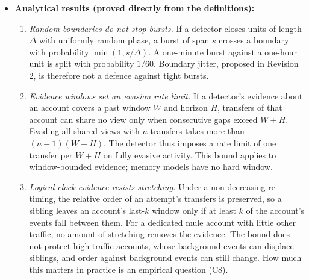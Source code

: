 \documentclass[11pt,a4paper]{article}
\begin{document}
\begin{itemize}[leftmargin=*]
\begin{enumerate}[leftmargin=*]
        \item \textbf{Timing-invariant detection (proposed).} A detector restricted to the logical-clock block of Step 4 and the event attributes, compared with the wall-clock detector on clean and attacked data. It needs no attack examples and no adversarial training. Its clean-data cost is the price of robustness, and it may be large, because wall-clock features carry real signal.
        \item \textbf{Gated: memory and two-stage aggregation.} Revision 2's DMT-GNN (GRU memory, per-counterparty Stage 1, cross-counterparty Stage 2) is built only if TD-GNN shows a modelling gap at small horizons relative to the feature baseline.
    \end{enumerate}
    \item \textbf{Analytical results (proved directly from the definitions):}
    \begin{enumerate}[leftmargin=*]
        \item \textit{Random boundaries do not stop bursts.} If a detector closes units of length $\Delta$ with uniformly random phase, a burst of span $s$ crosses a boundary with probability $\min(1,s/\Delta)$. A one-minute burst against a one-hour unit is split with probability $1/60$. Boundary jitter, proposed in Revision 2, is therefore not a defence against tight bursts.
        \item \textit{Evidence windows set an evasion rate limit.} If a detector's evidence about an account covers a past window $W$ and horizon $H$, transfers of that account can share no view only when consecutive gaps exceed $W+H$. Evading all shared views with $n$ transfers takes more than $(n-1)(W+H)$. The detector thus imposes a rate limit of one transfer per $W+H$ on fully evasive activity. This bound applies to window-bounded evidence; memory models have no hard window.
        \item \textit{Logical-clock evidence resists stretching.} Under a non-decreasing re-timing, the relative order of an attempt's transfers is preserved, so a sibling leaves an account's last-$k$ window only if at least $k$ of the account's events fall between them. For a dedicated mule account with little other traffic, no amount of stretching removes the evidence. The bound does not protect high-traffic accounts, whose background events can displace siblings, and order against background events can still change. How much this matters in practice is an empirical question (C8).
    \end{enumerate}

\end{itemize}
\end{document}
